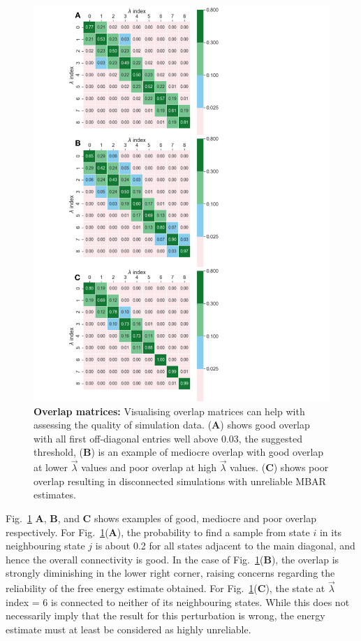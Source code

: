 \documentclass[9pt,bestpractices]{livecoms}
\begin{document}
\begin{figure}[ht!]
\includegraphics[width=0.90\columnwidth]{figures/fig12_overlap/Figure.pdf}
\caption{\label{fig:overlap} \textbf{Overlap matrices:} Visualising overlap matrices can help with assessing the quality of simulation data. (\textbf{A}) shows good overlap with all first off-diagonal entries well above 0.03, the suggested threshold, (\textbf{B}) is an example of mediocre overlap with good overlap at lower $\vec{\lambda}$ values and poor overlap at high $\vec{\lambda}$ values. (\textbf{C}) shows poor overlap resulting in disconnected simulations with unreliable MBAR estimates.}
\end{figure}
%
Fig.~\ref{fig:overlap} \textbf{A}, \textbf{B}, and \textbf{C} shows examples of good, mediocre and poor overlap respectively. For Fig.~\ref{fig:overlap}(\textbf{A}), the probability to find a sample from state $i$ in its neighbouring state $j$ is about 0.2 for all states adjacent to the main diagonal, and hence the overall connectivity is good. In the case of Fig.~\ref{fig:overlap}(\textbf{B}), the overlap is strongly diminishing in the lower right corner, raising concerns regarding the reliability of the free energy estimate obtained. For Fig.~\ref{fig:overlap}(\textbf{C}), the state at $\vec{\lambda}$ index = 6 is connected to neither of its neighbouring states. While this does not necessarily imply that the result for this perturbation is wrong, the energy estimate must at least be considered as highly unreliable.
\end{document}
